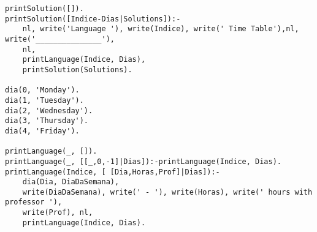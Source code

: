\documentclass{llncs}
\begin{document}
\begin{verbatim}
printSolution([]).
printSolution([Indice-Dias|Solutions]):-
	nl, write('Language '), write(Indice), write(' Time Table'),nl, write('_______________'),
	nl,
	printLanguage(Indice, Dias),
	printSolution(Solutions).

dia(0, 'Monday').
dia(1, 'Tuesday').
dia(2, 'Wednesday').
dia(3, 'Thursday').
dia(4, 'Friday').

printLanguage(_, []).
printLanguage(_, [[_,0,-1]|Dias]):-printLanguage(Indice, Dias).
printLanguage(Indice, [ [Dia,Horas,Prof]|Dias]):-
	dia(Dia, DiaDaSemana),
	write(DiaDaSemana), write(' - '), write(Horas), write(' hours with professor '), 
	write(Prof), nl,
	printLanguage(Indice, Dias).

\end{verbatim}
\end{document}
